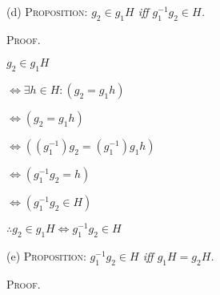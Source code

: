 \documentclass[12pt, a4paper]{article}
\begin{document}
\vspace{12mm}

\begin{list}
\item{(d) \textsc{Proposition:} \textit{$g_2\in g_1H$ iff $g^{-1}_1g_2\in H$.}}
\end{list}

\vspace{2mm}

\textsc{Proof.}

\vspace{4mm}

$g_2\in g_1H$\par
\vspace{5mm}
\hspace{8.2mm}$\Leftrightarrow \exists h\in H\colon (g_2=g_1h)$\par
\vspace{5mm}
\hspace{8.2mm}$\Leftrightarrow (g_2=g_1h)$\par
\vspace{5mm}
\hspace{8.2mm}$\Leftrightarrow ((g^{-1}_1)g_2=(g^{-1}_1)g_1h)$\par
\vspace{5mm}
\hspace{8.2mm}$\Leftrightarrow (g^{-1}_1g_2=h)$\par
\vspace{5mm}
\hspace{8.2mm}$\Leftrightarrow (g^{-1}_1g_2\in H)$\par
\vspace{5mm}
\hspace{8.2mm}$\therefore g_2\in g_1H\Longleftrightarrow g^{-1}_1g_2\in H$\par

\newpage

\begin{list}
\item{(e) \textsc{Proposition:} \textit{$g^{-1}_1g_2\in H$ iff $g_1H=g_2H$.}}
\end{list}

\vspace{2mm}

\textsc{Proof.}

\vspace{4mm}
\end{document}
